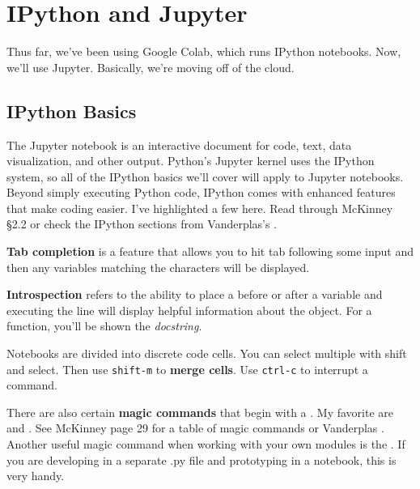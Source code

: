 \section{IPython and Jupyter}





Thus far, we've been using Google Colab, which runs IPython notebooks. Now, we'll use Jupyter. Basically, we're moving off of the cloud.


\subsection{IPython Basics}
The Jupyter notebook is an interactive document for code, text, data visualization, and other output. Python's Jupyter kernel uses the IPython system, so all of the IPython basics we'll cover will apply to Jupyter notebooks. Beyond simply executing Python code, IPython comes with enhanced features that make coding easier. I've highlighted a few here. Read through McKinney \S2.2 or check the IPython sections from Vanderplas's . 

\smallskip

\noindent \textbf{Tab completion} is a feature that allows you to hit tab following some input and then any variables matching the characters will be displayed. 

\smallskip

\noindent \textbf{Introspection} refers to the ability to place a  before or after a variable and executing the line will display helpful information about the object. For a function, you'll be shown the \emph{docstring}.

\smallskip
\noindent Notebooks are divided into discrete code cells. You can select multiple with shift and select. Then use \texttt{shift-m} to \textbf{merge cells}. Use \texttt{ctrl-c} to interrupt a command. 

\smallskip
\noindent There are also certain \textbf{magic commands} that begin with a \code{\%}. My favorite are  and . See McKinney page 29 for a table of magic commands or Vanderplas . Another useful magic command when working with your own modules is the . If you are developing in a separate .py file and prototyping in a notebook, this is very handy. 

